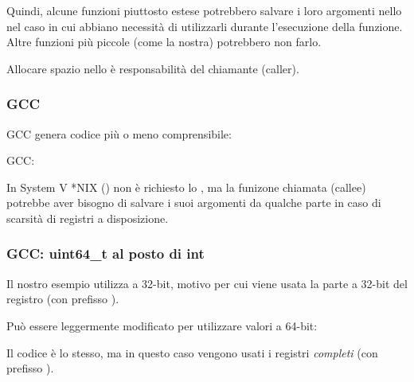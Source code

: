 Quindi, alcune funzioni piuttosto estese potrebbero salvare i loro argomenti nello  nel caso in cui 
abbiano necessità di utilizzarli durante l'esecuzione della funzione. Altre funzioni più piccole (come la nostra) potrebbero non farlo.

Allocare spazio nello  è responsabilità del chiamante (\gls{caller}).

\subsubsection{GCC}

\Optimizing GCC genera codice più o meno comprensibile:



\NonOptimizing GCC:




In System V *NIX (\SysVABI) non è richiesto lo , ma la funizone chiamata (\gls{callee}) potrebbe aver bisogno di salvare
i suoi argomenti da qualche parte in caso di scarsità di registri a disposizione.

\subsubsection{GCC: uint64\_t al posto di int}

Il nostro esempio utilizza \Tint a 32-bit, motivo per cui viene usata la parte a 32-bit del registro (con prefisso ).

Può essere leggermente modificato per utilizzare valori a 64-bit:





Il codice è lo stesso, ma in questo caso vengono usati i registri \emph{completi} (con prefisso ).
